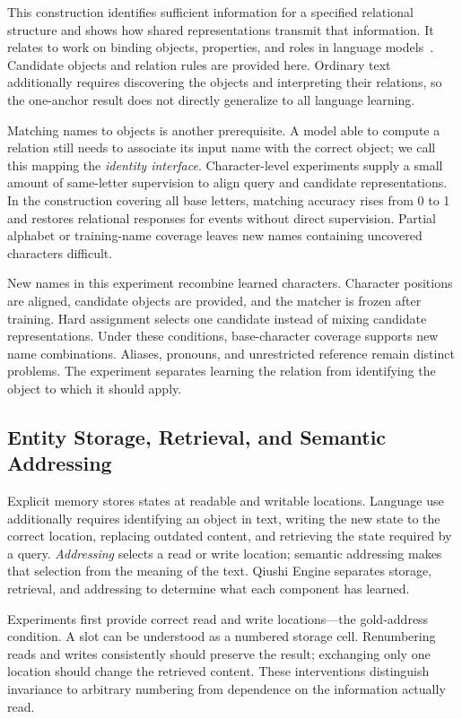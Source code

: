 This construction identifies sufficient information for a specified relational structure and shows how shared representations transmit that information. It relates to work on binding objects, properties, and roles in language models~\citep{feng2024binding,dai2024binding}. Candidate objects and relation rules are provided here. Ordinary text additionally requires discovering the objects and interpreting their relations, so the one-anchor result does not directly generalize to all language learning.

Matching names to objects is another prerequisite. A model able to compute a relation still needs to associate its input name with the correct object; we call this mapping the \emph{identity interface}. Character-level experiments supply a small amount of same-letter supervision to align query and candidate representations. In the construction covering all base letters, matching accuracy rises from 0 to 1 and restores relational responses for events without direct supervision. Partial alphabet or training-name coverage leaves new names containing uncovered characters difficult.

New names in this experiment recombine learned characters. Character positions are aligned, candidate objects are provided, and the matcher is frozen after training. Hard assignment selects one candidate instead of mixing candidate representations. Under these conditions, base-character coverage supports new name combinations. Aliases, pronouns, and unrestricted reference remain distinct problems. The experiment separates learning the relation from identifying the object to which it should apply.

\subsection{Entity Storage, Retrieval, and Semantic Addressing}
\label{sec:memory_branch}

Explicit memory stores states at readable and writable locations. Language use additionally requires identifying an object in text, writing the new state to the correct location, replacing outdated content, and retrieving the state required by a query. \emph{Addressing} selects a read or write location; semantic addressing makes that selection from the meaning of the text. Qiushi Engine separates storage, retrieval, and addressing to determine what each component has learned.

Experiments first provide correct read and write locations---the gold-address condition. A slot can be understood as a numbered storage cell. Renumbering reads and writes consistently should preserve the result; exchanging only one location should change the retrieved content. These interventions distinguish invariance to arbitrary numbering from dependence on the information actually read.

